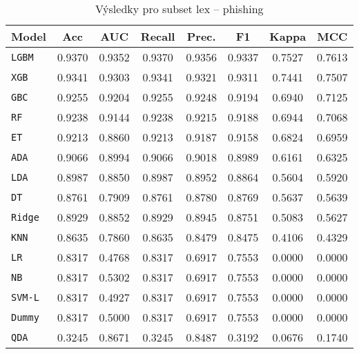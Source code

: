 \begin{table}[H]
  \centering
  \small
  \caption{Výsledky pro subset lex – phishing}
  \begin{tabular}{|l|c|c|c|c|c|c|c|}
    \hline
    \textbf{Model} & \textbf{Acc} & \textbf{AUC} & \textbf{Recall} & \textbf{Prec.} & \textbf{F1} & \textbf{Kappa} & \textbf{MCC} \\
    \hline
    \texttt{LGBM} & 0.9370 & 0.9352 & 0.9370 & 0.9356 & 0.9337 & 0.7527 & 0.7613 \\
    \texttt{XGB} & 0.9341 & 0.9303 & 0.9341 & 0.9321 & 0.9311 & 0.7441 & 0.7507 \\
    \texttt{GBC} & 0.9255 & 0.9204 & 0.9255 & 0.9248 & 0.9194 & 0.6940 & 0.7125 \\
    \texttt{RF} & 0.9238 & 0.9144 & 0.9238 & 0.9215 & 0.9188 & 0.6944 & 0.7068 \\
    \texttt{ET} & 0.9213 & 0.8860 & 0.9213 & 0.9187 & 0.9158 & 0.6824 & 0.6959 \\
    \texttt{ADA} & 0.9066 & 0.8994 & 0.9066 & 0.9018 & 0.8989 & 0.6161 & 0.6325 \\
    \texttt{LDA} & 0.8987 & 0.8850 & 0.8987 & 0.8952 & 0.8864 & 0.5604 & 0.5920 \\
    \texttt{DT} & 0.8761 & 0.7909 & 0.8761 & 0.8780 & 0.8769 & 0.5637 & 0.5639 \\
    \texttt{Ridge} & 0.8929 & 0.8852 & 0.8929 & 0.8945 & 0.8751 & 0.5083 & 0.5627 \\
    \texttt{KNN} & 0.8635 & 0.7860 & 0.8635 & 0.8479 & 0.8475 & 0.4106 & 0.4329 \\
    \texttt{LR} & 0.8317 & 0.4768 & 0.8317 & 0.6917 & 0.7553 & 0.0000 & 0.0000 \\
    \texttt{NB} & 0.8317 & 0.5302 & 0.8317 & 0.6917 & 0.7553 & 0.0000 & 0.0000 \\
    \texttt{SVM-L} & 0.8317 & 0.4927 & 0.8317 & 0.6917 & 0.7553 & 0.0000 & 0.0000 \\
    \texttt{Dummy} & 0.8317 & 0.5000 & 0.8317 & 0.6917 & 0.7553 & 0.0000 & 0.0000 \\
    \texttt{QDA} & 0.3245 & 0.8671 & 0.3245 & 0.8487 & 0.3192 & 0.0676 & 0.1740 \\
    \hline
  \end{tabular}
\end{table}
\vspace{0.5cm}


